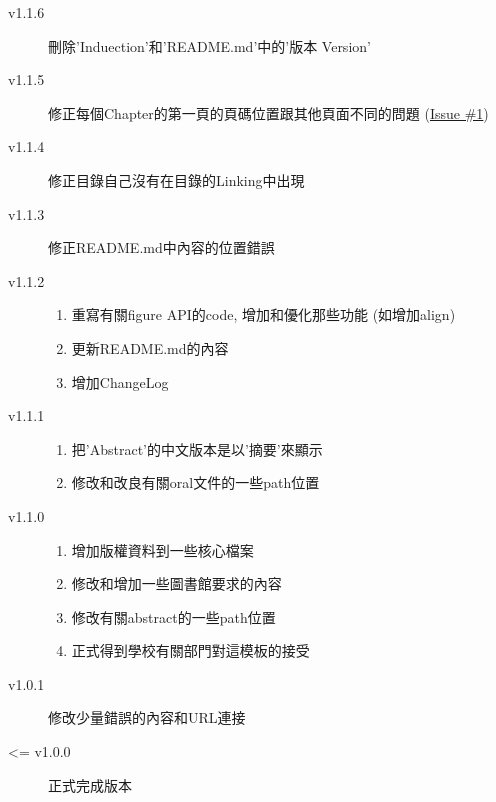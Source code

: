 \begin{description}
  \item[v1.1.6] 刪除'Induection'和'README.md'中的'版本 Version'

  \item[v1.1.5] 修正每個Chapter的第一頁的頁碼位置跟其他頁面不同的問題 (\href{https://github.com/wengan-li/ncku-thesis-templete-latex/issues/1}{Issue \#1})

  \item[v1.1.4] 修正目錄自己沒有在目錄的Linking中出現

  \item[v1.1.3] 修正README.md中內容的位置錯誤

  \item[v1.1.2] \hfill
    \begin{enumerate}
      \item 重寫有關figure API的code, 增加和優化那些功能 (如增加align)
      \item 更新README.md的內容
      \item 增加ChangeLog
    \end{enumerate}

  \item[v1.1.1] \hfill
    \begin{enumerate}
      \item 把'Abstract'的中文版本是以'摘要'來顯示
      \item 修改和改良有關oral文件的一些path位置
    \end{enumerate}

  \item[v1.1.0] \hfill
    \begin{enumerate}
      \item 增加版權資料到一些核心檔案
      \item 修改和增加一些圖書館要求的內容
      \item 修改有關abstract的一些path位置
      \item 正式得到學校有關部門對這模板的接受
    \end{enumerate}

  \item[v1.0.1] 修改少量錯誤的內容和URL連接

  \item[<= v1.0.0] 正式完成版本
\end{description}

